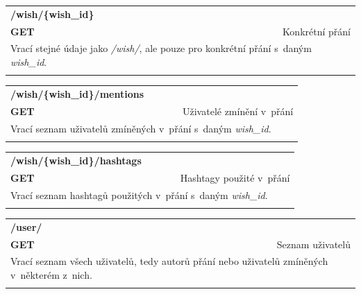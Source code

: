\documentclass[thesis=B,czech]{FITthesis}[2012/06/26]
\begin{document}
\begin{table}[h]
\begin{tabular}{llllr}
\rowcolor[HTML]{EFEFEF}
\large \textbf{/wish/\{wish\_id\}}        &         &                 &        & \multicolumn{1}{l}{}                \\
\rowcolor[HTML]{EFEFEF}
\textbf{GET}          &         &                 &        & Konkrétní přání                        \\
\multicolumn{5}{l}{\parbox[t]{12.8cm}{Vrací stejné údaje jako \textit{/wish/}, ale pouze pro konkrétní přání s~daným \textit{wish\_id}.}  } \\  
 & & & & \\
\end{tabular}
\end{table}
 

\begin{table}[h]
\begin{tabular}{llllr}
\rowcolor[HTML]{EFEFEF}
\large \textbf{/wish/\{wish\_id\}/mentions}        &         &                 &        & \multicolumn{1}{l}{}                \\
\rowcolor[HTML]{EFEFEF}
\textbf{GET}          &         &                 &        & Uživatelé zmínění v~přání                        \\
\multicolumn{5}{l}{\parbox[t]{12.8cm}{Vrací seznam uživatelů zmíněných v~přání s~daným \textit{wish\_id}.}  } \\  
 & & & & \\  
\end{tabular}
\end{table}


\begin{table}[h]
\begin{tabular}{llllr}
\rowcolor[HTML]{EFEFEF}
\large \textbf{/wish/\{wish\_id\}/hashtags}        &         &                 &        & \multicolumn{1}{l}{}                \\
\rowcolor[HTML]{EFEFEF}
\textbf{GET}          &         &                 &        & Hashtagy použité v~přání                        \\
\multicolumn{5}{l}{\parbox[t]{12.8cm}{Vrací seznam hashtagů použitých v~přání s~daným \textit{wish\_id}.}  } \\    
 & & & & \\
\end{tabular}
\end{table}

\begin{table}[h]
\begin{tabular}{llllr}
\rowcolor[HTML]{EFEFEF}
\large \textbf{/user/}        &         &                 &        & \multicolumn{1}{l}{}                \\
\rowcolor[HTML]{EFEFEF}
\textbf{GET}          &         &                 &        & Seznam uživatelů                        \\
\multicolumn{5}{l}{\parbox[t]{12.8cm}{Vrací seznam všech uživatelů, tedy autorů přání nebo uživatelů zmíněných v~některém z~nich. }  } \\  
 & & & & \\ 
\end{tabular}
\end{table}
\end{document}
